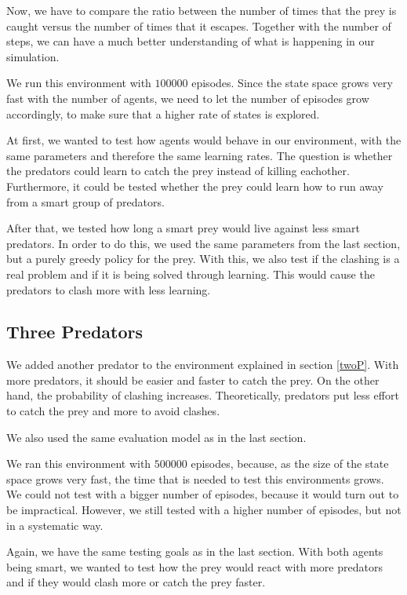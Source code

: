 \documentclass{article}
\begin{document}
Now, we have to compare the ratio between the number of times that the prey
is caught versus the number of times that it escapes. Together 
with the number of steps, we can have a much better understanding of what is
happening in our simulation.

We run this environment with $100000$ episodes. Since the state space grows
very fast with the number of agents, we need to let the number of episodes grow
accordingly, to make sure that a higher rate of states is explored.

At first, we wanted to test how agents would behave in our environment, with the same parameters and therefore
the same learning rates. The question is whether the predators could learn to catch the prey instead of killing eachother. Furthermore, it could be tested whether the prey could learn how to run away from a smart group of predators.


After that, we tested how long a smart prey would live against less smart
predators. In order to do this, we used the same parameters from the last section, but a purely greedy policy for the prey.
With this, we also test if the clashing is a real problem and if it is being solved
through learning. This would cause the predators to clash more with less
learning. 



\subsection{Three Predators}
We added another predator to the environment explained in  section \ref{twoP}.
With more predators, it should be easier and faster to catch the prey. On the
other hand, the probability of clashing increases. Theoretically, predators put
less effort to catch the prey and more to avoid clashes.

We also used the same evaluation model as in the last section.

We ran this environment with $500000$ episodes, because, as the size of the state
space grows very fast, the time that is needed to test this environments grows.
We could not test with a bigger number of episodes, because it would turn out to
be impractical. However, we still tested with a higher number of episodes, but not
in a systematic way.

Again, we have the same testing goals as in the last section.  With both agents being smart, we wanted to test how the prey would react with more predators and if they would
clash more or catch the prey faster.
\end{document}
